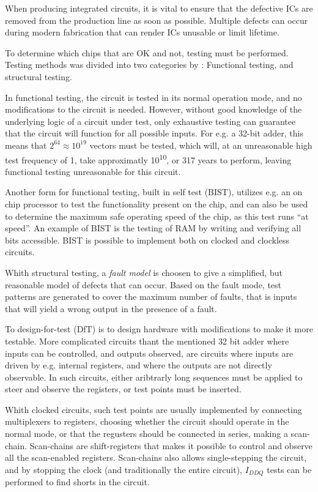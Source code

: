 When producing integrated circuits, it is vital to ensure that the
defective ICs are removed from the production line as soon as
possible. Multiple defects can occur during modern fabrication that
can render ICs unusable or limit lifetime.

To determine which chips that are OK and not, testing must be
performed. Testing methods was divided into two categories by
\cite{eldred}: Functional testing, and structural testing.

In functional testing, the circuit is tested in its normal operation
mode, and no modifications to the circuit is needed. However, without
good knowledge of the underlying logic of a circuit under test, only
exhaustive testing can guarantee that the circuit will function for
all possible inputs. For e.g. a 32-bit adder, this means that $2^{64}
\approx 10^{19}$ vectors must be tested, which will, at an
unreasonable high test frequency of \unit{1}{\giga \hertz}, take
approximatly \unit{10^{10}}{\second}, or 317 years to perform, leaving
functional testing unreasonable for this circuit.

Another form for functional testing, built in self test
(BIST), utilizes e.g. an on
chip processor to test the functionality present on the chip, and can
also be used to determine the maximum safe operating speed of the
chip, as this test runs ``at speed''. An example of BIST is the
testing of RAM by writing and verifying all bits accessible. BIST is
possible to implement both on clocked and clockless circuits.

Whith structural testing, a \emph{fault model} is choosen to give a
simplified, but reasonable model of defects that can occur. Based on
the fault mode, test patterns are generated to cover the maximum
number of faults, that is inputs that will yield a wrong output in the
presence of a fault.

To design-for-test (DfT) is to
design hardware with modifications to make it more testable. More
complicated circuits thant the mentioned 32 bit adder where inputs can
be controlled, and outputs observed, are circuits where inputs are
driven by e.g. internal registers, and where the outputs are not
directly observable. In such circuits, either aribtrarly long
sequences must be applied to steer and observe the registers, or test
points must be inserted.

Whith clocked circuits, such test points are usually implemented by
connecting multiplexers to registers, choosing whether the circuit
should operate in the normal mode, or that the regusters should be
connected in series, making a scan-chain. Scan-chains are
shift-registers that makes it possible to control and observe all the
scan-enabled registers. Scan-chains also allows single-stepping the
circuit, and by stopping the clock (and traditionally the entire
circuit), $I_{DDQ}$ tests can be performed to find shorts in the
circuit.

